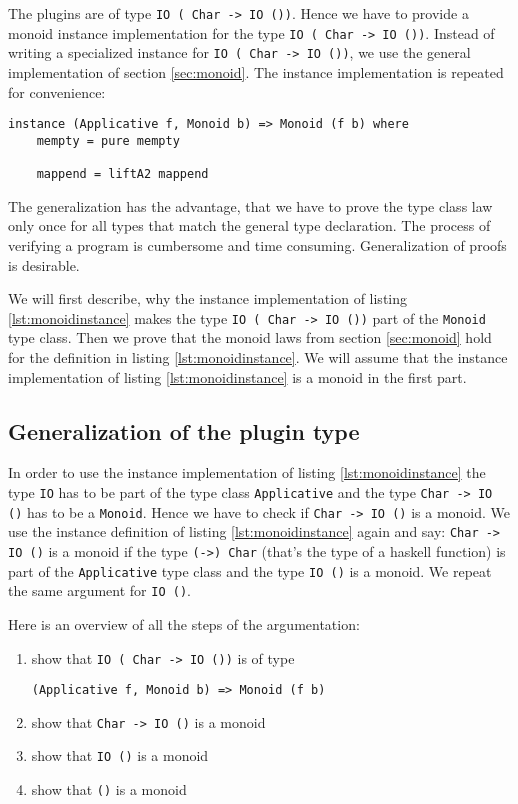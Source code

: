 The plugins are of type \verb|IO ( Char -> IO ())|. Hence we have to provide a monoid instance implementation for the type \verb|IO ( Char -> IO ())|. Instead of writing a specialized instance for \verb|IO ( Char -> IO ())|, we use the general implementation of section \ref{sec:monoid}.
The instance implementation is repeated for convenience:

\begin{lstlisting}[caption={Monoid instance},label={lst:monoidinstance}]
instance (Applicative f, Monoid b) => Monoid (f b) where
    mempty = pure mempty

    mappend = liftA2 mappend
\end{lstlisting}
The generalization has the advantage, that we have to prove the type class law only once for all types that match the general type declaration. The process of verifying a program is cumbersome and time consuming. Generalization of proofs is desirable.

We will first describe, why the instance implementation of listing \ref{lst:monoidinstance} makes the type \verb|IO ( Char -> IO ())| part of the \verb|Monoid| type class. Then we prove that the monoid laws from section \ref{sec:monoid} hold for the definition in listing \ref{lst:monoidinstance}. We will assume that the instance implementation of listing \ref{lst:monoidinstance} is a monoid in the first part.

\subsection{Generalization of the plugin type }
\label{sec:generalization}

In order to use the instance implementation of listing \ref{lst:monoidinstance} the type \verb|IO| has to be part of the type class \verb|Applicative| and the type \verb|Char -> IO ()| has to be a \verb|Monoid|. 
Hence we have to check if \verb|Char -> IO ()| is a monoid. We use the instance definition of listing \ref{lst:monoidinstance} again and say: \verb|Char -> IO ()| is a monoid if the type \verb|(->) Char| (that's the type of a haskell function) is part of the \verb|Applicative| type class and the type \verb|IO ()| is a monoid. We repeat the same argument for \verb|IO ()|.

Here is an overview of all the steps of the argumentation:
\begin{enumerate}
\item show that  \verb|IO ( Char -> IO ())| is of type 
\begin{verbatim}
(Applicative f, Monoid b) => Monoid (f b)
\end{verbatim}
\item show that \verb|Char -> IO ()| is a monoid
\item show that \verb|IO ()| is a monoid
\item show that \verb|()| is a monoid
\end{enumerate}


